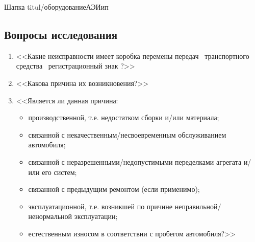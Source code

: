 \setcounter{page}{1}

%
 Шапка 
{titul/оборудованиеАЭИип}  
%
\subsection{Вопросы исследования}
\begin{enumerate}
   
   \item
    <<Какие неисправности имеет коробка перемены передач \, транспортного средства \, регистрационный знак ?>>
   
  \item
    <<Какова причина их возникновения?>>
%   
%   
    \item  <<Является ли данная причина:
\begin{itemize}
        \item производственной, т.е. недостатком сборки и/или материала;
        \item связанной с некачественным/несвоевременным обслуживанием автомобиля;
        \item связанной с неразрешенными/недопустимыми переделками агрегата и/или его систем;
        \item связанной с предыдущим ремонтом (если применимо);
        \item эксплуатационной, т.е. возникшей по причине неправильной/ненормальной эксплуатации;
        \item  естественным износом в соответствии с пробегом автомобиля?>> 
 	\end{itemize}
%	
    
\end{enumerate}


